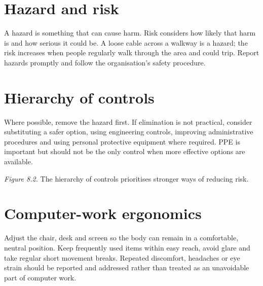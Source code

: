 \documentclass[11pt,openany,oneside]{book}
\begin{document}
\section{Hazard and risk}
A hazard is something that can cause harm. Risk considers how likely that harm is and how serious it could be. A loose cable across a walkway is a hazard; the risk increases when people regularly walk through the area and could trip. Report hazards promptly and follow the organisation's safety procedure.

\section{Hierarchy of controls}
Where possible, remove the hazard first. If elimination is not practical, consider substituting a safer option, using engineering controls, improving administrative procedures and using personal protective equipment where required. PPE is important but should not be the only control when more effective options are available.

\begin{center}
\end{center}
\textit{Figure 8.2.} The hierarchy of controls prioritises stronger ways of reducing risk.

\section{Computer-work ergonomics}
Adjust the chair, desk and screen so the body can remain in a comfortable, neutral position. Keep frequently used items within easy reach, avoid glare and take regular short movement breaks. Repeated discomfort, headaches or eye strain should be reported and addressed rather than treated as an unavoidable part of computer work.
\end{document}
